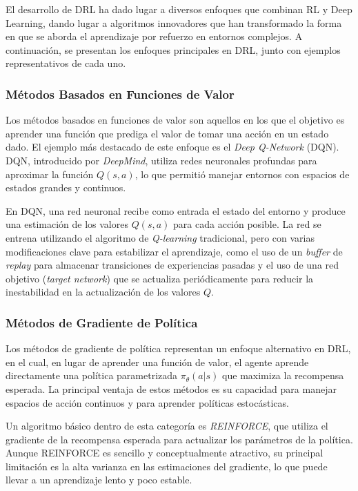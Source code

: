 \documentclass[a4paper,12pt, twoside]{report}
\begin{document}
El desarrollo de DRL ha dado lugar a diversos enfoques que combinan RL y Deep Learning, dando 
lugar a algoritmos innovadores que han transformado la forma en que se aborda el aprendizaje 
por refuerzo en entornos complejos. A continuación, se presentan los enfoques principales en 
DRL, junto con ejemplos representativos de cada uno.

\subsubsection{Métodos Basados en Funciones de Valor}

Los métodos basados en funciones de valor son aquellos en los que el objetivo es aprender 
una función que prediga el valor de tomar una acción en un estado dado. El ejemplo más 
destacado de este enfoque es el \textit{Deep Q-Network} (DQN). DQN, introducido por 
\textit{DeepMind}, utiliza redes neuronales profundas para aproximar la función \(Q(s, a)\), 
lo que permitió manejar entornos con espacios de estados grandes y continuos.

En DQN, una red neuronal recibe como entrada el estado del entorno y produce una estimación 
de los valores \(Q(s, a)\) para cada acción posible. La red se entrena utilizando el 
algoritmo de \textit{Q-learning} tradicional, pero con varias modificaciones clave para 
estabilizar el aprendizaje, como el uso de un \textit{buffer} de \textit{replay} para 
almacenar transiciones de experiencias pasadas y el uso de una red objetivo 
(\textit{target network}) que se actualiza periódicamente para reducir la inestabilidad 
en la actualización de los valores \(Q\).

\subsubsection{Métodos de Gradiente de Política}

Los métodos de gradiente de política representan un enfoque alternativo en DRL, en el cual, 
en lugar de aprender una función de valor, el agente aprende directamente una política 
parametrizada \(\pi_{\theta}(a|s)\) que maximiza la recompensa esperada. La principal 
ventaja de estos métodos es su capacidad para manejar espacios de acción continuos y 
para aprender políticas estocásticas.

Un algoritmo básico dentro de esta categoría es \textit{REINFORCE}, que utiliza el gradiente 
de la recompensa esperada para actualizar los parámetros de la política. Aunque REINFORCE es 
sencillo y conceptualmente atractivo, su principal limitación es la alta varianza en las 
estimaciones del gradiente, lo que puede llevar a un aprendizaje lento y poco estable.
\end{document}

